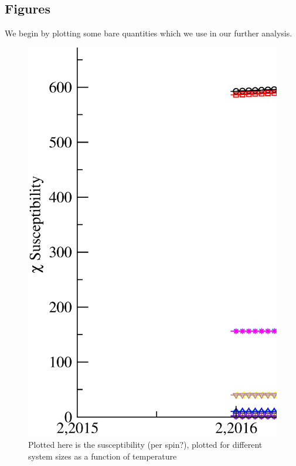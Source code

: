 \subsection{Figures}
We begin by plotting some bare quantities which we use in our further analysis.
\begin{figure}[!htpb]
  \centering
  \includegraphics[width=\textwidth]{./plots/3DXY/vsT/Susceptibility.eps}
  \caption{Plotted here is the susceptibility (per spin?), plotted for different system sizes as a function of temperature}
\end{figure}


